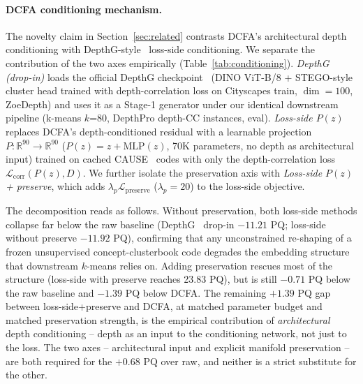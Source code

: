 \documentclass[10pt,twocolumn,letterpaper]{article}
\begin{document}
\paragraph{DCFA conditioning mechanism.}
The novelty claim in Section~\ref{sec:related} contrasts DCFA's architectural depth conditioning with DepthG-style~\cite{sick2024depthg} loss-side conditioning. We separate the contribution of the two axes empirically (Table~\ref{tab:conditioning}). \emph{DepthG~\cite{sick2024depthg} (drop-in)} loads the official DepthG checkpoint~\cite{sick2024depthg} (DINO ViT-B/8 + STEGO-style cluster head trained with depth-correlation loss on Cityscapes train, $\dim{=}100$, ZoeDepth) and uses it as a Stage-1 generator under our identical downstream pipeline (k-means $k$=80, DepthPro depth-CC instances, eval). \emph{Loss-side $P(z)$} replaces DCFA's depth-conditioned residual with a learnable projection $P : \mathbb{R}^{90} \to \mathbb{R}^{90}$ ($P(z) = z + \text{MLP}(z)$, 70K parameters, no depth as architectural input) trained on cached CAUSE~\cite{kim2024cause} codes with only the depth-correlation loss $\mathcal{L}_\text{corr}(P(z), D)$. We further isolate the preservation axis with \emph{Loss-side $P(z)$ + preserve}, which adds $\lambda_p \mathcal{L}_\text{preserve}$ ($\lambda_p=20$) to the loss-side objective.

The decomposition reads as follows. Without preservation, both loss-side methods collapse far below the raw baseline (DepthG~\cite{sick2024depthg} drop-in $-11.21$ PQ; loss-side without preserve $-11.92$ PQ), confirming that any unconstrained re-shaping of a frozen unsupervised concept-clusterbook code degrades the embedding structure that downstream $k$-means relies on. Adding preservation rescues most of the structure (loss-side with preserve reaches 23.83 PQ), but is still $-0.71$ PQ below the raw baseline and $-1.39$ PQ below DCFA. The remaining $+1.39$ PQ gap between loss-side+preserve and DCFA, at matched parameter budget and matched preservation strength, is the empirical contribution of \emph{architectural} depth conditioning -- depth as an input to the conditioning network, not just to the loss. The two axes -- architectural input and explicit manifold preservation -- are both required for the $+0.68$ PQ over raw, and neither is a strict substitute for the other.
\end{document}
